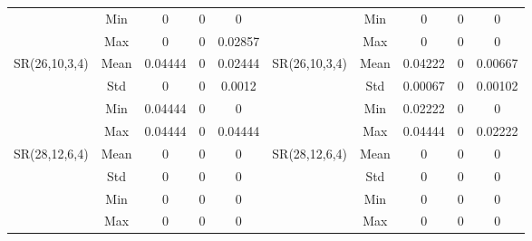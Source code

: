 \documentclass[letterpaper]{article} \usepackage{aaai24}  \usepackage{times}  \usepackage{helvet}  \usepackage{courier}  \usepackage[hyphens]{url}  \usepackage{graphicx} \urlstyle{rm} \def\UrlFont{\rm}  \usepackage{natbib}  \usepackage{caption} \frenchspacing  \setlength{\pdfpagewidth}{8.5in} \setlength{\pdfpageheight}{11in} \usepackage{algorithm}
\begin{document}
\begin{table*}[t]
{\begin{tabular}{@{}ccccc|ccccc@{}}
\multicolumn{1}{c|}{}                               & \multicolumn{1}{c|}{Min}  & 0         & 0         & 0        & \multicolumn{1}{c|}{}                               & \multicolumn{1}{c|}{Min}  & 0         & 0         & 0        \\
\multicolumn{1}{c|}{}                               & \multicolumn{1}{c|}{Max}  & 0         & 0         & 0.02857  & \multicolumn{1}{c|}{}                               & \multicolumn{1}{c|}{Max}  & 0         & 0         & 0        \\ \midrule
\multicolumn{1}{c|}{\multirow{4}{*}{SR(26,10,3,4)}} & \multicolumn{1}{c|}{Mean} & 0.04444   & 0         & 0.02444  & \multicolumn{1}{c|}{\multirow{4}{*}{SR(26,10,3,4)}} & \multicolumn{1}{c|}{Mean} & 0.04222   & 0         & 0.00667  \\
\multicolumn{1}{c|}{}                               & \multicolumn{1}{c|}{Std}  & 0         & 0         & 0.0012   & \multicolumn{1}{c|}{}                               & \multicolumn{1}{c|}{Std}  & 0.00067   & 0         & 0.00102  \\
\multicolumn{1}{c|}{}                               & \multicolumn{1}{c|}{Min}  & 0.04444   & 0         & 0        & \multicolumn{1}{c|}{}                               & \multicolumn{1}{c|}{Min}  & 0.02222   & 0         & 0        \\
\multicolumn{1}{c|}{}                               & \multicolumn{1}{c|}{Max}  & 0.04444   & 0         & 0.04444  & \multicolumn{1}{c|}{}                               & \multicolumn{1}{c|}{Max}  & 0.04444   & 0         & 0.02222  \\ \midrule
\multicolumn{1}{c|}{\multirow{4}{*}{SR(28,12,6,4)}} & \multicolumn{1}{c|}{Mean} & 0         & 0         & 0        & \multicolumn{1}{c|}{\multirow{4}{*}{SR(28,12,6,4)}} & \multicolumn{1}{c|}{Mean} & 0         & 0         & 0        \\
\multicolumn{1}{c|}{}                               & \multicolumn{1}{c|}{Std}  & 0         & 0         & 0        & \multicolumn{1}{c|}{}                               & \multicolumn{1}{c|}{Std}  & 0         & 0         & 0        \\
\multicolumn{1}{c|}{}                               & \multicolumn{1}{c|}{Min}  & 0         & 0         & 0        & \multicolumn{1}{c|}{}                               & \multicolumn{1}{c|}{Min}  & 0         & 0         & 0        \\
\multicolumn{1}{c|}{}                               & \multicolumn{1}{c|}{Max}  & 0         & 0         & 0        & \multicolumn{1}{c|}{}                               & \multicolumn{1}{c|}{Max}  & 0         & 0         & 0        \\ \midrule

\end{tabular}}
\end{table*}
\end{document}
